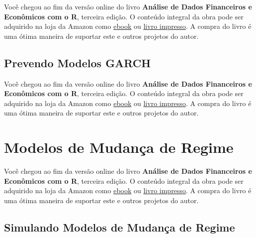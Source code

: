 \documentclass[
  11pt,
]{book}
\newenvironment{pleasebuyit}
{\begin{noteblock}
		
	} {\end{noteblock}}
\begin{document}
\begin{pleasebuyit}
Você chegou ao fim da versão online do livro \textbf{Análise de Dados
Financeiros e Econômicos com o R}, terceira edição. O conteúdo integral
da obra pode ser adquirido na loja da Amazon como
\href{https://www.amazon.com.br/dp/B08WNC27ZY}{ebook} ou
\href{https://www.amazon.com/dp/B08WP8CCDB}{livro impresso}. A compra do
livro é uma ótima maneira de suportar este e outros projetos do autor.
\end{pleasebuyit}

\hypertarget{prevendo-modelos-garch}{%
\subsection{Prevendo Modelos GARCH}\label{prevendo-modelos-garch}}

\begin{pleasebuyit}
Você chegou ao fim da versão online do livro \textbf{Análise de Dados
Financeiros e Econômicos com o R}, terceira edição. O conteúdo integral
da obra pode ser adquirido na loja da Amazon como
\href{https://www.amazon.com.br/dp/B08WNC27ZY}{ebook} ou
\href{https://www.amazon.com/dp/B08WP8CCDB}{livro impresso}. A compra do
livro é uma ótima maneira de suportar este e outros projetos do autor.
\end{pleasebuyit}

\hypertarget{mudanca-regime}{%
\section{Modelos de Mudança de Regime}\label{mudanca-regime}}

\begin{pleasebuyit}
Você chegou ao fim da versão online do livro \textbf{Análise de Dados
Financeiros e Econômicos com o R}, terceira edição. O conteúdo integral
da obra pode ser adquirido na loja da Amazon como
\href{https://www.amazon.com.br/dp/B08WNC27ZY}{ebook} ou
\href{https://www.amazon.com/dp/B08WP8CCDB}{livro impresso}. A compra do
livro é uma ótima maneira de suportar este e outros projetos do autor.
\end{pleasebuyit}

\hypertarget{simulando-modelos-de-mudanuxe7a-de-regime}{%
\subsection{Simulando Modelos de Mudança de Regime}\label{simulando-modelos-de-mudanuxe7a-de-regime}}
\end{document}
